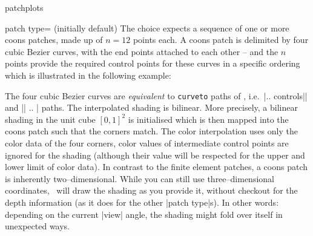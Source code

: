 \begin{pgfplotslibrary}{patchplots}
\begin{pgfplotskey}{patch type= (initially default)}
	The choice  expects a sequence of one or more coons patches, made up of $n=12$ points each. A coons patch is delimited by four cubic Bezier curves, with the end points attached to each other -- and the $n$ points provide the required control points for these curves in a specific ordering which is illustrated in the following example:
\begin{codeexample}[]
\end{codeexample}
	\noindent The four cubic Bezier curves are \emph{equivalent} to \texttt{curveto} paths of \pgfname, i.e.\  |.. controls|| and || .. | paths. The interpolated shading is bilinear. More precisely, a bilinear shading in the unit cube $[0,1]^2$ is initialised which is then mapped into the coons patch such that the corners match. The color interpolation uses only the color data of the four corners, color values of intermediate control points are ignored for the shading (although their value will be respected for the upper and lower limit of color data). In contrast to the finite element patches, a coons patch is inherently two--dimensional. While you can still use three--dimensional coordinates, \PGFPlots\ will draw the shading as you provide it, without checkout for the depth information (as it does for the other |patch type|s). In other words: depending on the current |view| angle, the shading might fold over itself in unexpected ways.


\end{pgfplotskey}
\end{pgfplotslibrary}
